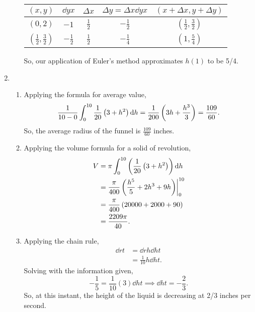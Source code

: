 \begin{enumerate}
\begin{enumerate}
\begin{table}[H]
\begin{center}
\begin{tabular}{|c|c|c|c|c|}
						\hline
						$(x,y)$ & $\dd{y}{x}$ & $\Delta x$ & $\Delta y = \Delta x\dd{y}{x}$ & $(x+\Delta x, y+\Delta y)$ \\
						\hline
						$(0,2)$ & $-1$ & $\frac{1}{2}$ & $-\frac{1}{2}$ & $(\frac{1}{2},\frac{3}{2})$ \\
						\hline
						$(\frac{1}{2},\frac{3}{2})$ & $-\frac{1}{2}$ & $\frac{1}{2}$ & $-\frac{1}{4}$ & $(1,\frac{5}{4})$ \\
						\hline
					\end{tabular}
				\end{center}
			\end{table}
			So, our application of Euler's method approximates $h(1)$ to be 5/4.
	\end{enumerate}

	\item \begin{enumerate}
		\item Applying the formula for average value,
			\begin{equation*}
				\frac{1}{10-0}\int_{0}^{10}{\frac{1}{20}\left(3+h^2\right)\mathrm{d} h} = \frac{1}{200}\left(3h+\frac{h^3}{3}\right) = \frac{109}{60}.
			\end{equation*}
			So, the average radius of the funnel is $\frac{109}{60}$ inches.
		\item Applying the volume formula for a solid of revolution,
			\begin{align*}
				V &= \pi\int_{0}^{10}{\left(\frac{1}{20}\left(3+h^2\right)\right)\mathrm{d} h} \\
				&= \frac{\pi}{400}\left(\frac{h^5}{5}+2h^3+9h\right)\biggr\rvert_0^{10} \\
				&= \frac{\pi}{400}\left(20000+2000+90\right) \\
				&= \frac{2209\pi}{40}.
			\end{align*}
		\item Applying the chain rule,
			\begin{align*}
				\dd{r}{t} &= \dd{r}{h}\dd{h}{t} \\
				&= \frac{1}{10}h\dd{h}{t}.
			\end{align*}
			Solving with the information given,
			\begin{equation*}
				-\frac{1}{5} = \frac{1}{10}(3)\dd{h}{t} \implies \dd{h}{t} = -\frac{2}{3}.
			\end{equation*}
			So, at this instant, the height of the liquid is decreasing at 2/3 inches per second.
	\end{enumerate}


\end{enumerate}
